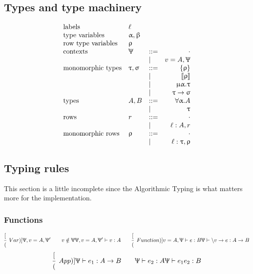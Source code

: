 \documentclass{article}
\newcommand{\define}{::=}
\newcommand{\arrow}{\to}
\newcommand{\rcd}[1]{\{#1\}}
\newcommand{\vnt}[1]{\llbracket #1 \rrbracket}
\newcommand{\recursive}[2]{\upmu {#1}. {#2}}
\newcommand{\fa}[2]{\forall {#1}. {#2}}
\newcommand{\rowtpvar}{\uprho}
\newcommand{\tpvar}{\upalpha}
\newcommand{\tpvaralt}{\upbeta}
\newcommand{\emptyrow}{\cdot}
\newcommand{\spc}{\qquad}
\newcommand{\declCtx}{\Uppsi}
\newcommand{\derives}[3]{#1 \vdash #2 : #3}
\newcommand{\lbl}{\ell}
\newcommand{\expr}{e}
\newcommand{\var}{v}
\newcommand{\row}{r}
\newcommand{\rowm}{\uprho}
\newcommand{\tp}{A}
\newcommand{\tpalt}{B}
\newcommand{\tpm}{\uptau}
\newcommand{\tpmalt}{\upsigma}
\newcommand{\deduct}[3][]
{
  \begin{prooftree}
    \hypo{#2}
    \infer1[\text{#1}]{#3}
  \end{prooftree}
}
\begin{document}
\subsection{Types and type machinery}

\[
  \begin{array}{lllrl}
    \text{labels} & \lbl & & \\
    \text{type variables} & \tpvar, \tpvaralt & & \\
    \text{row type variables} & \rowtpvar & & \\
    \text{contexts} & \declCtx & \define & \cdot \\
    & & | & v = \tp, \declCtx \\
    \text{monomorphic types} & \tpm, \tpmalt & \define & \rcd \uprho  \\
    & & | & \vnt \uprho \\
    & & | & \recursive \tpvar \tpm \\
    & & | & \tpm \arrow \tpmalt \\
    \text{types} & \tp, \tpalt & \define & \fa \tpvar \tp \\
    & & | & \tpm \\
    \text{rows} & \row & \define & \emptyrow  \\
    & & | & \lbl : \tp, \row \\
    \text{monomorphic rows} & \rowm & \define & \emptyrow  \\
    & & | & \lbl : \tpm, \rowm  \\
  \end{array}
\]

\subsection{Typing rules}

This section is a little incomplete since the Algorithmic Typing is what matters
more for the implementation.

\subsubsection{Functions}
\[
  \deduct
  [(Var)]
  {\declCtx, \var = \tp, \declCtx' \spc \var \notin \declCtx}
  {\derives {\declCtx, \var = \tp, \declCtx'} \var \tp}
  \spc
  \deduct
  [(Function)]
  {\derives {\var = \tp, \declCtx} \expr \tpalt}
  {\derives \declCtx {\backslash \var \arrow \expr} { \tp
      \arrow \tpalt}}
\]
\[
  \deduct
  [(App)]
  {\derives \declCtx {\expr_1} {\tp \arrow \tpalt} \spc \derives \declCtx
    {\expr_2} {\tp}}
  {\derives \declCtx {\expr_1 \expr_2} \tpalt}
\]
\end{document}
